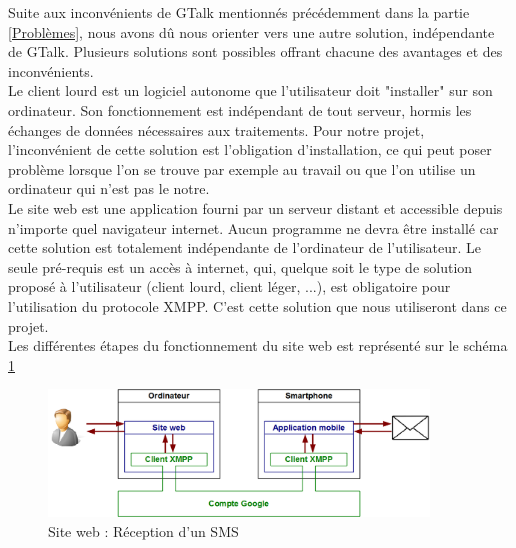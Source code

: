 Suite aux inconvénients de GTalk mentionnés précédemment dans la partie \ref{Problèmes}, nous avons dû nous orienter vers une autre solution, indépendante de GTalk.
Plusieurs solutions sont possibles offrant chacune des avantages et des inconvénients.
\\


Le client lourd est un logiciel autonome que l'utilisateur doit "installer" sur son ordinateur.
Son fonctionnement est indépendant de tout serveur, hormis les échanges de données nécessaires aux traitements.
Pour notre projet, l'inconvénient de cette solution est l'obligation d'installation, ce qui peut poser problème lorsque l'on se trouve par exemple au travail ou que l'on utilise un ordinateur qui n'est pas le notre.
\\


Le site web est une application fourni par un serveur distant et accessible depuis n'importe quel navigateur internet.
Aucun programme ne devra être installé car cette solution est totalement indépendante de l'ordinateur de l'utilisateur.
Le seule pré-requis est un accès à internet, qui, quelque soit le type de solution proposé à l'utilisateur (client lourd, client léger, ...), est obligatoire pour l'utilisation du protocole XMPP.
C'est cette solution que nous utiliseront dans ce projet.
\\


Les différentes étapes du fonctionnement du site web est représenté sur le schéma \ref{schemaFonctionnement_siteWeb}
\begin{figure}[!h]
	\center
	\includegraphics[width=0.9\textwidth]{img/schemaFonctionnement_siteWeb.png}
	\caption{Site web : Réception d'un SMS}
	\label{schemaFonctionnement_siteWeb}
\end{figure}
